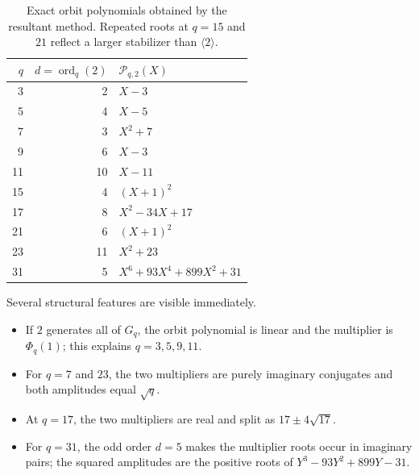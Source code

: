\documentclass[11pt,oneside]{article}
\theoremstyle{definition}
\theoremstyle{remark}
\newcommand{\ord}{\operatorname{ord}}
\begin{document}
\begin{table}[ht]
\centering\small
\begin{tabularx}{\textwidth}{@{}r r X@{}}
\toprule
$q$ & $d=\ord_q(2)$ & $\mathscr P_{q,2}(X)$ \\
\midrule
3  & 2  & $X-3$ \\
5  & 4  & $X-5$ \\
7  & 3  & $X^2+7$ \\
9  & 6  & $X-3$ \\
11 & 10 & $X-11$ \\
15 & 4  & $(X+1)^2$ \\
17 & 8  & $X^2-34X+17$ \\
21 & 6  & $(X+1)^2$ \\
23 & 11 & $X^2+23$ \\
31 & 5  & $X^6+93X^4+899X^2+31$ \\
\bottomrule
\end{tabularx}
\caption{Exact orbit polynomials obtained by the resultant method. Repeated roots
at $q=15$ and $21$ reflect a larger stabilizer than $\langle2\rangle$.}
\label{tab:orbit-polynomials}
\end{table}

Several structural features are visible immediately.
\begin{itemize}
 \item If $2$ generates all of $G_q$, the orbit polynomial is linear and the
 multiplier is $\Phi_q(1)$; this explains $q=3,5,9,11$.
 \item For $q=7$ and $23$, the two multipliers are purely imaginary conjugates and
 both amplitudes equal $\sqrt q$.
 \item At $q=17$, the two multipliers are real and split as $17\pm4\sqrt{17}$.
 \item For $q=31$, the odd order $d=5$ makes the multiplier roots occur in imaginary
 pairs; the squared amplitudes are the positive roots of
 $Y^3-93Y^2+899Y-31$.
\end{itemize}
\end{document}
